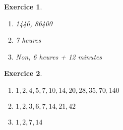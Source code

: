 \documentclass[a4paper]{article}
\theoremstyle{exostyle}
\newtheorem{exercice}{Exercice}
\begin{document}
\begin{exercice}
	\begin{enumerate}
		\item 1440, 86400
		\item 7 heures
		\item Non, 6 heures + 12 minutes
	\end{enumerate}
\end{exercice}

\begin{exercice}
	\begin{enumerate}
		\item $1, 2, 4, 5, 7, 10, 14, 20, 28, 35, 70, 140$
		\item $1, 2, 3, 6, 7, 14, 21, 42$
		\item $1, 2, 7, 14$
	\end{enumerate}
\end{exercice}
\end{document}
